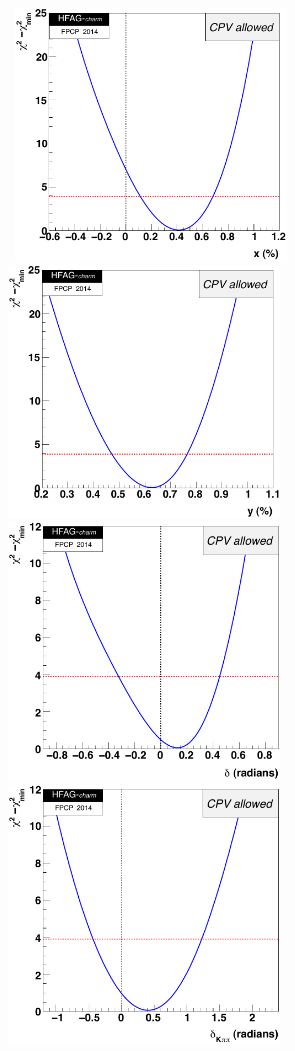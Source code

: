 \begin{figure}
\begin{center}
\hbox{\hskip0.50in
\includegraphics[width=72mm]{figures/charm/fig_plot_x1d}
\hskip0.20in
\includegraphics[width=72mm]{figures/charm/fig_plot_y1d}}
\hbox{\hskip0.50in
\includegraphics[width=72mm]{figures/charm/fig_plot_d1d}
\hskip0.20in
\includegraphics[width=72mm]{figures/charm/fig_plot_d21d}}

\end{center}
\end{figure}
